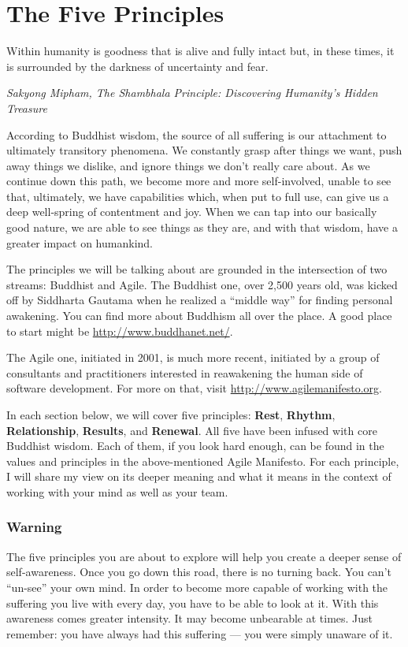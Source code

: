 \chapter{The Five Principles}
\epigraph{Within humanity is goodness that is alive and fully intact but, in these times, it is surrounded by the darkness of uncertainty and fear.}{\textit{Sakyong Mipham, The Shambhala Principle: Discovering Humanity's Hidden Treasure}}

According to Buddhist wisdom, the source of all suffering is our attachment to ultimately transitory phenomena. 
We constantly grasp after things we want, push away things we dislike, and ignore things we don't really
care about. As we continue down this path, we become more and more self-involved, unable to see that,
ultimately, we have capabilities which, when put to full use, can give us a deep well-spring of contentment
and joy. When we can tap into our basically good nature, we are able to see things as they are,
and with that wisdom, have a greater impact on humankind.

The principles we will be talking about are grounded in the intersection of two streams: Buddhist and
Agile. The Buddhist one, over 2,500 years old, was kicked off by Siddharta Gautama when he realized
a ``middle way'' for finding personal awakening. You can find more about Buddhism all over the place.
A good place to start might be \url{http://www.buddhanet.net/}.

The Agile one, initiated in 2001, is much more recent,
initiated by a group of consultants and practitioners interested in reawakening the human side of
software development. For more on that, visit \url{http://www.agilemanifesto.org}.

In each section below, we will cover five principles: \textbf{Rest}, \textbf{Rhythm}, \textbf{Relationship}, 
\textbf{Results}, and \textbf{Renewal}. All five have been infused with core Buddhist wisdom. Each of them,
if you look hard enough, can be found in the values and principles in the above-mentioned Agile Manifesto. 
For each principle, I will share my view on its deeper meaning and what it means in the context of working 
with your mind as well as your team.

\subsection{Warning}

The five principles you are about to explore will help you create a deeper sense of self-awareness. Once you
go down this road, there is no turning back. You can't ``un-see'' your own mind. In order to become more
capable of working with the suffering you live with every day, you have to be able to look at it. With this
awareness comes greater intensity. It may become unbearable at times. Just remember: you have always
had this suffering --- you were simply unaware of it.

